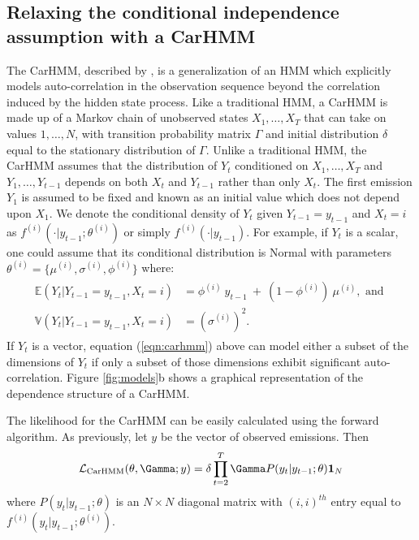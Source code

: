 \subsection{Relaxing the conditional independence assumption with a CarHMM}

The CarHMM, described by \citet{Lawler:2019}, is a generalization of an HMM which explicitly models auto-correlation in the observation sequence beyond the correlation induced by the hidden state process. Like a traditional HMM, a CarHMM is made up of a Markov chain of unobserved states $X_1,\ldots, X_T$ that can take on values $1, \ldots, N$, with transition probability matrix $\Gamma$ and initial distribution $\delta$ equal to the stationary distribution of $\Gamma$. Unlike a traditional HMM, the CarHMM assumes that the distribution of $Y_t$ conditioned on $X_1,\ldots, X_T$ and $Y_1,\ldots, Y_{t-1}$ depends on both $X_t$ and $Y_{t-1}$ rather than only $X_t$. 
The first emission $Y_1$ is assumed to be fixed and known as an initial value which does not depend upon $X_1$.
%
We denote the conditional density of $Y_t$ given $Y_{t-1} = y_{t-1}$ and $X_t=i$ as $f^{(i)}( \cdot | y_{t-1}; \theta^{(i)})$ or simply $f^{(i)}( \cdot | y_{t-1})$.
For example, if $Y_t$ is a scalar, one could assume that its conditional distribution is Normal with parameters $\theta^{(i)} = \{\mu^{(i)},\sigma^{(i)},\phi^{(i)}\}$ where:
%
\begin{align}
\label{eqn:carhmm}
\begin{split}
\mathbb{E}(Y_t|Y_{t-1} = y_{t-1},X_t=i) &= \phi^{(i)} ~ y_{t-1} ~+ ~(1-\phi^{(i)})  ~\mu^{(i)}, \text{ and } \\
\mathbb{V}(Y_t| Y_{t-1} = y_{t-1}, X_t = i) &= (\sigma^{(i)})^2.
\end{split}
\end{align}
%
If $Y_t$ is a vector, equation (\ref{eqn:carhmm}) above can model either a subset of the dimensions of $Y_t$ if only a subset of those dimensions exhibit significant auto-correlation. Figure \ref{fig:models}b shows a graphical representation of the dependence structure of a CarHMM.

The likelihood for the CarHMM can be easily calculated using the forward algorithm. As previously, let $y$ be the vector of observed emissions. Then
\begin{equation*}
    \calL_{\text{CarHMM}}(\theta,\Gamma;y) = \delta \prod_{t=2}^T \Gamma P(y_t|y_{t-1};\theta) \mathbf{1}_N
    \label{CarHMM_likelihood}
\end{equation*}
where
%
$P(y_t|y_{t-1};\theta)$ is an $N \times N$ diagonal matrix with $(i,i)^{th}$ entry equal to $f^{(i)}(y_t|y_{t-1}; \theta^{(i)})$.

